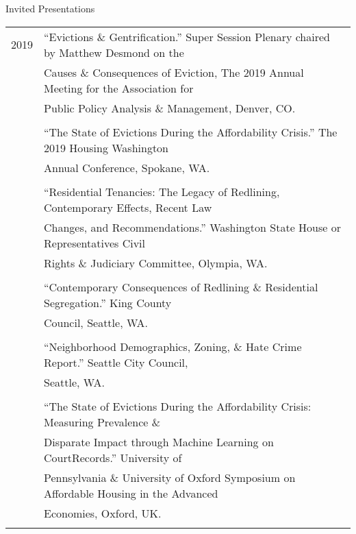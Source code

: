 \documentclass{resume} %
\begin{document}
%
%

\begin{rSection}{Invited Presentations}
\vspace{5mm}
\begin{tabular}{ @{} >{}l @{\hspace{6ex}} l }

2019	&``Evictions \& Gentrification.'' Super Session Plenary chaired by Matthew Desmond on the\\
		& Causes \& Consequences of Eviction, The 2019 Annual Meeting for the Association for\\
		& Public Policy Analysis \& Management, Denver, CO.\\\\

		&``The State of Evictions During the Affordability Crisis.'' The 2019 Housing Washington\\ 
		&Annual Conference, Spokane, WA.\\\\		

		&``Residential Tenancies: The Legacy of Redlining, Contemporary Effects, Recent Law\\
		&Changes, and Recommendations.'' Washington State House or Representatives Civil\\
		&Rights \& Judiciary Committee, Olympia, WA.\\\\

		&``Contemporary Consequences of Redlining \& Residential Segregation.'' King County\\
		& Council, Seattle, WA.\\\\

		&``Neighborhood Demographics, Zoning, \& Hate Crime Report.'' Seattle City Council,\\
		&Seattle, WA.\\\\

		&``The State of Evictions During the Affordability Crisis: Measuring Prevalence \&\\
		&Disparate Impact through Machine Learning on CourtRecords.'' University of\\
		& Pennsylvania \& University of Oxford Symposium on Affordable Housing in the Advanced\\
		& Economies, Oxford, UK.\\\\


\end{tabular}
\end{rSection}
\end{document}

